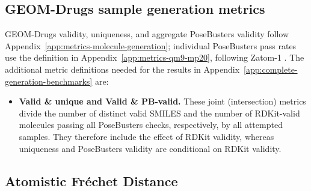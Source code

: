 \documentclass{article} %
\begin{document}
\subsection{GEOM-Drugs sample generation metrics}
\label{app:metrics-geom-drugs-generation}

GEOM-Drugs validity, uniqueness, and aggregate PoseBusters validity follow
Appendix~\ref{app:metrics-molecule-generation}; individual PoseBusters pass
rates use the definition in Appendix~\ref{app:metrics-qm9-mp20}, following
Zatom-1 \citep{morehead2026zatom1}. The additional metric definitions needed
for the results in Appendix~\ref{app:complete-generation-benchmarks} are:
\begin{itemize}
  \item \textbf{Valid \& unique and Valid \& PB-valid.} These joint (intersection) metrics divide the number of distinct valid SMILES and the number of RDKit-valid molecules passing all PoseBusters checks, respectively, by all attempted samples. They therefore include the effect of RDKit validity, whereas uniqueness and PoseBusters validity are conditional on RDKit validity.
\end{itemize}

\subsection{Atomistic Fr\'echet Distance}
\label{app:metrics-afd}
\end{document}
